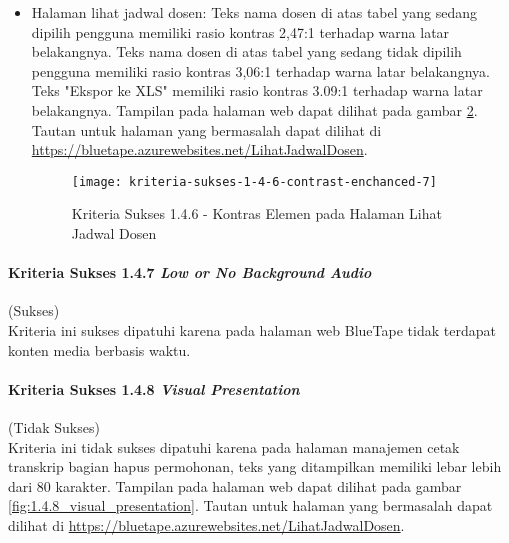 \begin{itemize}
    \begin{figure}[H]
        \centering  
        \texttt{[image: kriteria-sukses-1-4-6-contrast-enchanced-6-2]}  
        \caption[Kriteria Sukses 1.4.6 - Kontras Elemen pada Halaman Entri Jadwal Dosen (Gambar 2)]{Kriteria Sukses 1.4.6 - Kontras Elemen pada Halaman Entri Jadwal Dosen (Gambar 1)}
        \label{fig:1.4.6_contrast_enchanced_6_2}  
    \end{figure} 

    \item Halaman lihat jadwal dosen: Teks nama dosen di atas tabel yang sedang dipilih pengguna memiliki rasio kontras 2,47:1 terhadap warna latar belakangnya. Teks nama dosen di atas tabel yang sedang tidak dipilih pengguna memiliki rasio kontras 3,06:1 terhadap warna latar belakangnya. Teks "Ekspor ke XLS" memiliki rasio kontras 3.09:1 terhadap warna latar belakangnya. Tampilan pada halaman web dapat dilihat pada gambar \ref{fig:1.4.6_contrast_enchanced_7}. Tautan untuk halaman yang bermasalah dapat dilihat di \url{https://bluetape.azurewebsites.net/LihatJadwalDosen}.
    \begin{figure}[H]
        \centering  
        \texttt{[image: kriteria-sukses-1-4-6-contrast-enchanced-7]}  
        \caption[Kriteria Sukses 1.4.6 - Kontras Elemen pada Halaman Lihat Jadwal Dosen]{Kriteria Sukses 1.4.6 - Kontras Elemen pada Halaman Lihat Jadwal Dosen}
        \label{fig:1.4.6_contrast_enchanced_7}  
    \end{figure} 
\end{itemize}

\paragraph{Kriteria Sukses 1.4.7 \textit{Low or No Background Audio}}
\label{par:kepatuhan_bluetape_kriteria_sukses_1.4.7}
(Sukses)\\

Kriteria ini sukses dipatuhi karena pada halaman web BlueTape tidak terdapat konten media berbasis waktu.

\paragraph{Kriteria Sukses 1.4.8 \textit{Visual Presentation}}
\label{par:kepatuhan_bluetape_kriteria_sukses_1.4.8}
(Tidak Sukses)\\

Kriteria ini tidak sukses dipatuhi karena pada halaman manajemen cetak transkrip bagian hapus permohonan, teks yang ditampilkan memiliki lebar lebih dari 80 karakter. Tampilan pada halaman web dapat dilihat pada gambar \ref{fig:1.4.8_visual_presentation}. Tautan untuk halaman yang bermasalah dapat dilihat di \url{https://bluetape.azurewebsites.net/LihatJadwalDosen}.

